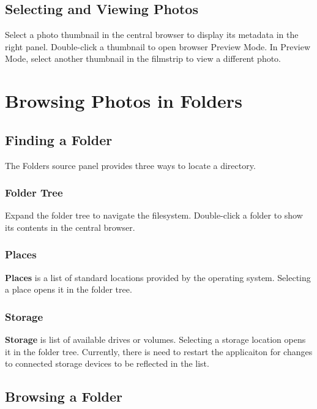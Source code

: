 \documentclass[11pt]{article}
\begin{document}
\subsection{Selecting and Viewing Photos}

Select a photo thumbnail in the central browser to display its metadata in the right
panel. Double-click a thumbnail to open browser Preview Mode. In Preview Mode, select
another thumbnail in the filmstrip to view a different photo.

\section{Browsing Photos in Folders}

\subsection{Finding a Folder}

The Folders source panel provides three ways to locate a directory.

\subsubsection{Folder Tree}

Expand the folder tree to navigate the filesystem. Double-click a folder to
show its contents in the central browser.

\subsubsection{Places}

\textbf{Places} is a list of standard locations provided by the operating
system. Selecting a place opens it in the folder tree.

\subsubsection{Storage}

\textbf{Storage} is list of available drives or volumes. Selecting a
storage location opens it in the folder tree. Currently, there is need to restart
the applicaiton for changes to connected storage devices
to be reflected in the list.

\subsection{Browsing a Folder}
\end{document}
